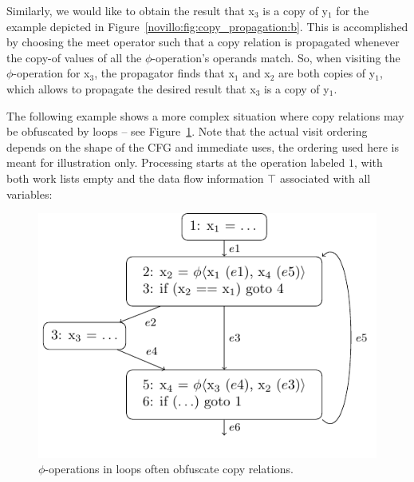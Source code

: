 Similarly, we would like to obtain the result that x$_3$ is a copy of y$_1$ for
the example depicted in Figure~\ref{novillo:fig:copy_propagation:b}. This is
accomplished by choosing the meet operator such that a copy relation is
propagated whenever the copy-of values of all the $\phi$-operation's operands
match. So, when visiting the $\phi$-operation for x$_3$, the propagator finds
that x$_1$ and x$_2$ are both copies of y$_1$, which allows to propagate the
desired result that x$_3$ is a copy of y$_1$.

The following example shows a more complex situation where copy relations may be
obfuscated by loops -- see Figure~\ref{novillo:fig:copy_propagation_loop}.  Note
that the actual visit ordering depends on the shape of the CFG and immediate
uses, the ordering used here is meant for illustration only. Processing starts
at the operation labeled $1$, with both work lists empty and the data flow
information $\top$ associated with all variables:

\begin{figure}[b!]
  \begin{center}
    \includegraphics{copy_propagation_loop}
  \end{center}
  \vspace{-1em}
  \caption{$\phi$-operations in loops often obfuscate copy relations.}
  \label{novillo:fig:copy_propagation_loop}
\end{figure}

